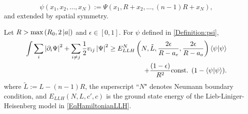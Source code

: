 \begin{equation}
\label{Definition:psi}
\psi(x_1,x_2,\dots,x_N):=\Psi(x_1,R+x_2,\dots,(n-1)R+x_N), 
\end{equation}
 and extended by spatial symmetry.
	\begin{lemma}\label{LemmaNormBoundEpsilonSpin1/2Fermi}
	Let $R>\max\left(R_0,2\left\lvert a \right\rvert\right) $ and $ \epsilon\in[0,1] $. For $ \psi $ defined in \eqref{Definition:psi},
	\begin{equation}
	\begin{aligned}
	\int \sum_{i}\left\lvert \partial_i\Psi \right\rvert^2+\sum_{i\neq j} \frac{1}{2}v_{ij}\left\lvert \Psi \right\rvert^2\geq E_{LLH}^N \left(N,\tilde{L},\frac{2\epsilon}{R-a_e},\frac{2\epsilon}{R-a_o}\right)\left\langle\psi|\psi\right\rangle\\+ \frac{(1-\epsilon)}{R^2}\textnormal{const. }(1-\left\langle\psi|\psi\right\rangle).
	\end{aligned}
	\end{equation}
	where $ \tilde{L}:=L-(n-1)R $, the superscript ``$ N $" denotes Neumann boundary condition, and $ E_{LLH}(N,L,c',c) $ is the ground state energy of the Lieb-Liniger-Heisenberg model in \eqref{EqHamiltonianLLH}.
\end{lemma}
